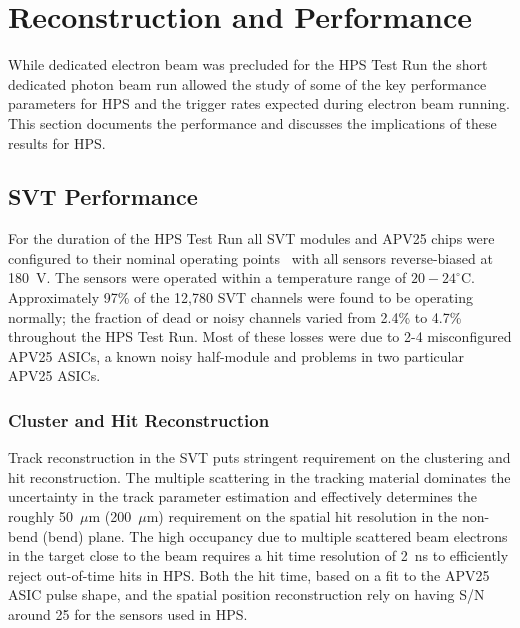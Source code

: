\documentclass[final,3p,times,twocolumn]{elsarticle}
\begin{document}


\section{Reconstruction and Performance}

While dedicated electron beam was precluded for the HPS Test Run the short dedicated photon beam run 
allowed the study of some of the key performance parameters for HPS and the trigger rates expected during 
electron beam running. This section documents the performance and discusses the implications of these 
results for HPS.

\subsection{SVT Performance}

For the duration of the HPS Test Run all SVT modules and APV25 chips were configured to their 
nominal operating points~\cite{Jones:1069892} with all sensors reverse-biased at 180~V.  The 
sensors were operated within a temperature range of  $20-24^\circ$C.
Approximately 97\% of the 12,780 SVT channels were found to
be operating normally;  the fraction of dead or noisy channels varied from 2.4\% to 4.7\% throughout 
the HPS Test Run. Most of these losses were due to 2-4 misconfigured APV25 ASICs, a known noisy 
half-module and problems in two particular APV25 ASICs.


\subsubsection{Cluster and Hit Reconstruction}
Track reconstruction in the SVT puts stringent requirement on the clustering and hit reconstruction. The 
multiple scattering in the tracking material dominates the uncertainty in the track parameter estimation and 
effectively determines the roughly 50~$\mu$m (200~$\mu$m) requirement on the spatial hit resolution in 
the non-bend (bend) plane.  The high 
occupancy due to multiple scattered beam electrons in the target close to the beam requires a hit time 
resolution of 2~ns to efficiently reject out-of-time hits in HPS. Both the hit time, based on a fit to the 
APV25 ASIC pulse shape, and the spatial position reconstruction rely on having S/N around 25 for the 
sensors used in HPS. 
\end{document}
